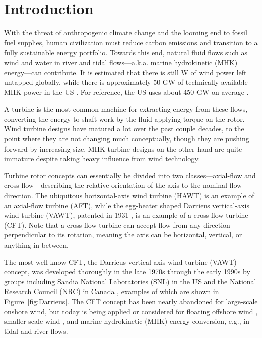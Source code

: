 \chapter{Introduction}

With the threat of anthropogenic climate change and the looming end to fossil
fuel supplies, human civilization must reduce carbon emissions \cite{Hansen2013}
and transition to a fully sustainable energy portfolio. Towards this end,
natural fluid flows such as wind and water in river and tidal flows---a.k.a.
marine hydrokinetic (MHK) energy---can contribute. It is estimated that there is
still  W of wind power
left untapped globally, while there is approximately 50 GW of technically
available MHK power in the US \cite{Haas2011, Jacobson2012, Haas2013}. For
reference, the US uses about 450 GW on average .

A turbine is the most common machine for extracting energy from these flows,
converting the energy to shaft work by the fluid applying torque on the rotor.
Wind turbine designs have matured a lot over the past couple decades, to the
point where they are not changing much conceptually, though they are pushing
forward by increasing size. MHK turbine designs on the other hand are quite
immature despite taking heavy influence from wind technology.

Turbine rotor concepts can essentially be divided into two classes---axial-flow
and cross-flow---describing the relative orientation of the axis to the nominal
flow direction. The ubiquitous horizontal-axis wind turbine (HAWT) is an example
of an axial-flow turbine (AFT), while the egg-beater shaped Darrieus
vertical-axis wind turbine (VAWT), patented in 1931 \cite{Darrieus1931}, is an
example of a cross-flow turbine (CFT). Note that a cross-flow turbine can accept
flow from any direction perpendicular to its rotation, meaning the axis can be
horizontal, vertical, or anything in between.

The most well-know CFT, the Darrieus vertical-axis wind turbine (VAWT) concept,
was developed thoroughly in the late 1970s through the early 1990s by groups
including Sandia National Laboratories (SNL) in the US and the National Research
Council (NRC) in Canada \cite{Para2002}, examples of which are shown in
Figure~\ref{fig:Darrieus}. The CFT concept has been nearly abandoned for
large-scale onshore wind, but today is being applied or considered for floating
offshore wind \cite{Sandia2012, Paulsen2011}, smaller-scale wind
\cite{Giges2012}, and marine hydrokinetic (MHK) energy conversion, e.g., in
tidal and river flows. 

